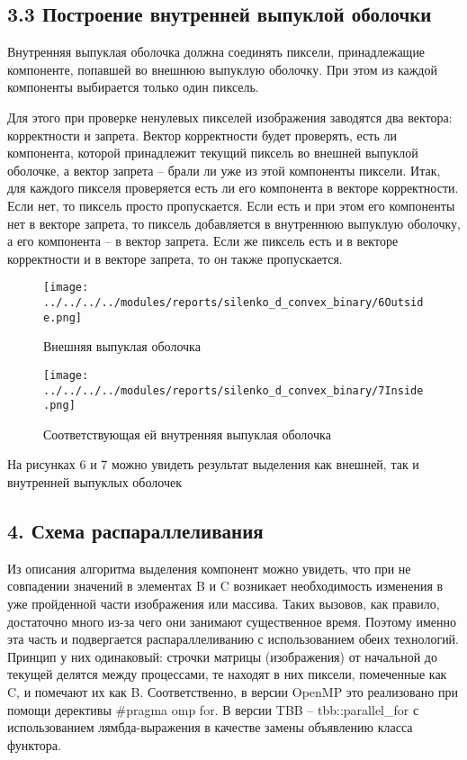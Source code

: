 \documentclass{report}
\begin{document}
\subsection*{ 3.3 Построение внутренней выпуклой оболочки}
\par Внутренняя выпуклая оболочка должна соединять пиксели, принадлежащие компоненте, попавшей во внешнюю выпуклую оболочку. При этом из каждой компоненты выбирается только один пиксель.
\par Для этого при проверке ненулевых пикселей изображения заводятся два вектора: корректности и запрета. Вектор корректности будет проверять, есть ли компонента, которой принадлежит текущий пиксель во внешней выпуклой оболочке, а вектор запрета – брали ли уже из этой компоненты пиксели. Итак, для каждого пикселя проверяется есть ли его компонента в векторе корректности. Если нет, то пиксель просто пропускается. Если есть и при этом его компоненты нет в векторе запрета, то пиксель добавляется в внутреннюю выпуклую оболочку, а его компонента – в вектор запрета. Если же пиксель есть и в векторе корректности и в векторе запрета, то он также пропускается.
\begin{figure}[htbp]
  \centering
  \texttt{[image: ../../../../modules/reports/silenko\_d\_convex\_binary/6Outside.png]}
  \caption{Внешняя выпуклая оболочка}\label{fig:../../../../modules/reports/silenko_d_convex_binary/6Outside.png}
\end{figure}
\begin{figure}[htbp]
  \centering
  \texttt{[image: ../../../../modules/reports/silenko\_d\_convex\_binary/7Inside.png]}
  \caption{Соответствующая ей внутренняя выпуклая оболочка}\label{fig:../../../../modules/reports/silenko_d_convex_binary/7Inside.png}
\end{figure}
\par На рисунках 6 и 7 можно увидеть результат выделения как внешней, так и внутренней выпуклых оболочек

\newpage


\begin{center}
\section*{4. Схема распараллеливания}
\end{center}
\par Из описания алгоритма выделения компонент можно увидеть, что при не совпадении значений в элементах B и C возникает необходимость изменения в уже пройденной части изображения или массива. Таких вызовов, как правило, достаточно много из-за чего они занимают существенное время. Поэтому именно эта часть и подвергается распараллеливанию с использованием обеих технологий. Принцип у них одинаковый: строчки матрицы (изображения) от начальной до текущей делятся между процессами, те находят в них пиксели, помеченные как C, и помечают их как B. Соответственно, в версии OpenMP это реализовано при помощи дерективы \#pragma omp for. В версии TBB – tbb::parallel\_for с использованием лямбда-выражения в качестве замены объявлению класса функтора.
\end{document}
